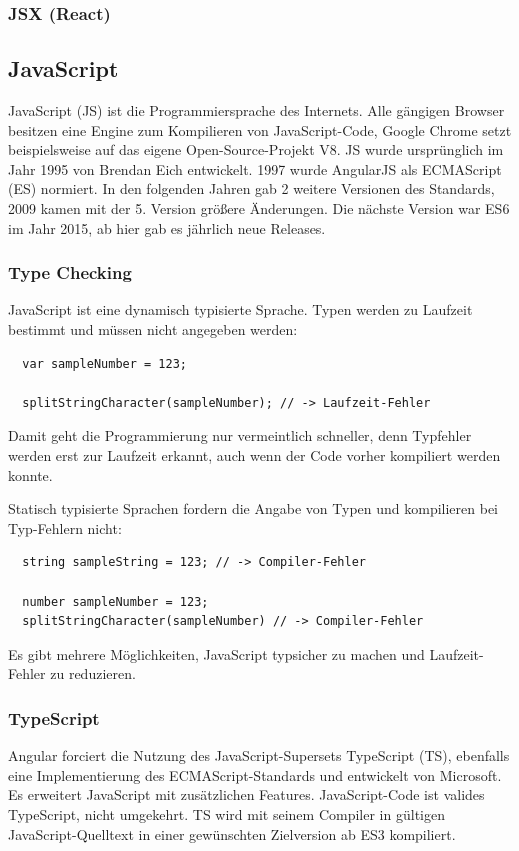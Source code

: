 \subsubsection{JSX (React)}



\subsection{JavaScript}
JavaScript (JS) ist die Programmiersprache des Internets. Alle gängigen Browser besitzen eine Engine zum Kompilieren von JavaScript-Code, Google Chrome setzt beispielsweise auf das eigene Open-Source-Projekt V8. JS wurde ursprünglich im Jahr 1995 von Brendan Eich entwickelt. 1997 wurde AngularJS als ECMAScript (ES) normiert. In den folgenden Jahren gab 2 weitere Versionen des Standards, 2009 kamen mit der 5. Version größere Änderungen. Die nächste Version war ES6 im Jahr 2015, ab hier gab es jährlich neue Releases.


\subsubsection{Type Checking}

JavaScript ist eine dynamisch typisierte Sprache. Typen werden zu Laufzeit bestimmt und müssen nicht angegeben werden:

\begin{verbatim}
  var sampleNumber = 123;

  splitStringCharacter(sampleNumber); // -> Laufzeit-Fehler
\end{verbatim}

Damit geht die Programmierung nur vermeintlich schneller, denn Typfehler werden erst zur Laufzeit erkannt, auch wenn der Code vorher kompiliert werden konnte.

Statisch typisierte Sprachen fordern die Angabe von Typen und kompilieren bei Typ-Fehlern nicht:

\begin{verbatim}
  string sampleString = 123; // -> Compiler-Fehler

  number sampleNumber = 123;
  splitStringCharacter(sampleNumber) // -> Compiler-Fehler
\end{verbatim}

Es gibt mehrere Möglichkeiten, JavaScript typsicher zu machen und Laufzeit-Fehler zu reduzieren. 

\subsubsection{TypeScript}
Angular forciert die Nutzung des JavaScript-Supersets TypeScript (TS), ebenfalls eine Implementierung des ECMAScript-Standards und entwickelt von Microsoft. Es erweitert JavaScript mit zusätzlichen Features. JavaScript-Code ist valides TypeScript, nicht umgekehrt. TS wird mit seinem Compiler in gültigen JavaScript-Quelltext in einer gewünschten Zielversion ab ES3 kompiliert.

